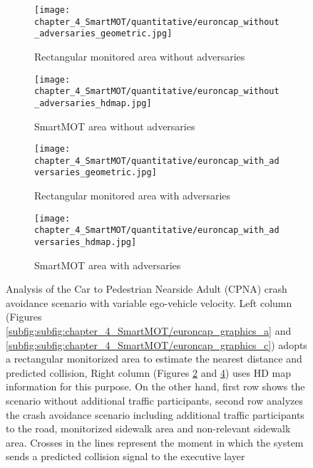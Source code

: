 \begin{figure}[h]
	\centering
	\begin{subfigure}{0.45\textwidth}
		\texttt{[image: chapter\_4\_SmartMOT/quantitative/euroncap\_without\_adversaries\_geometric.jpg]}
		\caption{Rectangular monitored area without adversaries}
		\label{subfig:chapter_4_SmartMOT/euroncap_graphics_a}
	\end{subfigure}
	\hfill
	\begin{subfigure}{0.45\textwidth}
		\texttt{[image: chapter\_4\_SmartMOT/quantitative/euroncap\_without\_adversaries\_hdmap.jpg]}
		\caption{SmartMOT area without adversaries}
		\label{subfig:chapter_4_SmartMOT/euroncap_graphics_b}
	\end{subfigure}
	\hfill
	\begin{subfigure}{0.45\textwidth}
		\texttt{[image: chapter\_4\_SmartMOT/quantitative/euroncap\_with\_adversaries\_geometric.jpg]}
		\caption{Rectangular monitored area with adversaries}
		\label{subfig:chapter_4_SmartMOT/euroncap_graphics_c}
	\end{subfigure}
	\hfill
	\begin{subfigure}{0.45\textwidth}
		\texttt{[image: chapter\_4\_SmartMOT/quantitative/euroncap\_with\_adversaries\_hdmap.jpg]}
		\caption{SmartMOT area with adversaries}
		\label{subfig:chapter_4_SmartMOT/euroncap_graphics_d}
	\end{subfigure}
	
	\caption[Analysis of the Car to Pedestrian Nearside Adult (CPNA) crash avoidance scenario with variable ego-vehicle velocity]{Analysis of the Car to Pedestrian Nearside Adult (CPNA) crash avoidance scenario with variable ego-vehicle velocity. Left column (Figures \ref{subfig:subfig:chapter_4_SmartMOT/euroncap_graphics_a} and \ref{subfig:subfig:chapter_4_SmartMOT/euroncap_graphics_c}) adopts a rectangular monitorized area to estimate the nearest distance and predicted collision, Right column (Figures \ref{subfig:chapter_4_SmartMOT/euroncap_graphics_b} and \ref{subfig:chapter_4_SmartMOT/euroncap_graphics_d}) uses HD map information for this purpose. On the other hand, first row shows the scenario without additional traffic participants, second row analyzes the crash avoidance scenario including additional traffic participants to the road, monitorized sidewalk area and non-relevant sidewalk area. Crosses in the lines represent the moment in which the system sends a predicted collision signal to the executive layer}
	\label{fig:4_cpna_results}
\end{figure}

